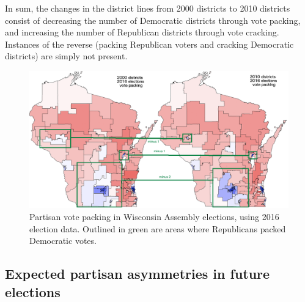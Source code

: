 \documentclass[preprint,12pt]{article}
\begin{document}
In sum, the changes in the district lines from 2000 districts to 2010 districts consist of decreasing the number of Democratic districts through vote packing, and increasing the number of Republican districts through vote cracking.
Instances of the reverse (packing Republican voters and cracking Democratic districts) are simply not present.
\begin{figure}[htb!]
    \begin{center}
        \includegraphics[scale=0.40]{../Figures/WI_compared/districts_compared_deltas.png}
        \caption{Partisan vote packing in Wisconsin Assembly elections, using 2016 election data.  Outlined in green are areas where Republicans packed Democratic votes.}\label{fig:DistrictMapDelta}
    \end{center}
\end{figure}



\subsection{Expected  partisan asymmetries in future elections}
\end{document}
